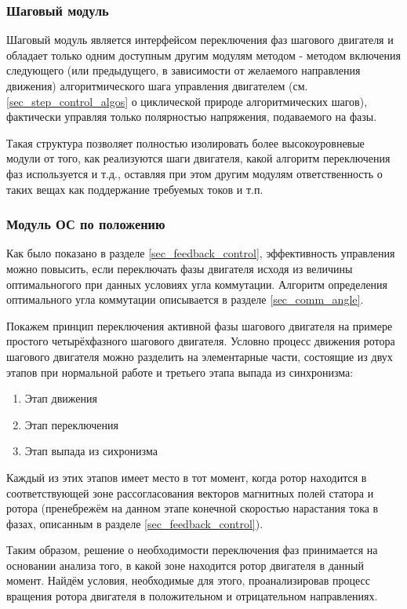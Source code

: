 \subsubsection{Шаговый модуль}

Шаговый модуль является интерфейсом переключения фаз шагового двигателя и
обладает только одним доступным другим модулям методом - методом включения
следующего (или предыдущего, в зависимости от желаемого направления движения)
алгоритмического шага управления двигателем (см. \ref{sec_step_control_algos}
о циклической природе алгоритмических шагов), фактически управляя только
полярностью напряжения, подаваемого на фазы.

Такая структура позволяет полностью изолировать более высокоуровневые модули от
того, как реализуются шаги двигателя, какой алгоритм переключения фаз
используется и т.д., оставляя при этом другим модулям ответственность о таких вещах
как поддержание требуемых токов и т.п.

\subsubsection{Модуль ОС по положению}

Как было показано в разделе \ref{sec_feedback_control}, эффективность управления
можно повысить, если переключать фазы двигателя исходя из величины оптимальногого
при данных условиях угла коммутации. Алгоритм определения оптимального угла
коммутации описывается в разделе \ref{sec_comm_angle}.

Покажем принцип переключения активной фазы шагового двигателя на примере простого
четырёхфазного шагового двигателя. Условно процесс движения ротора шагового двигателя
можно разделить на элементарные части, состоящие из двух этапов при нормальной
работе и третьего этапа выпада из синхронизма:

\begin{enumerate}
    \item Этап движения
    \item Этап переключения
    \item Этап выпада из сихронизма
\end{enumerate}

Каждый из этих этапов имеет место в тот момент, когда ротор находится в
соответствующей зоне рассогласования векторов магнитных полей статора и ротора
(пренебрежём на данном этапе конечной скоростью нарастания тока в фазах, описанным
в разделе \ref{sec_feedback_control}).

Таким образом, решение о необходимости переключения фаз принимается на основании
анализа того, в какой зоне находится ротор двигателя в данный момент. Найдём условия,
необходимые для этого, проанализировав процесс вращения ротора двигателя в
положительном и отрицательном направлениях.

